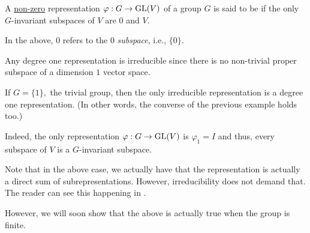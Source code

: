 \begin{defn}%
	A \underline{non-zero} representation $\varphi:G\to \operatorname{GL}(V)$ of a group $G$ is said to be  if the only $G$-invariant subspaces of $V$ are $0$ and $V.$
\end{defn}
In the above, $0$ refers to the $0$ \emph{subspace}, i.e., $\{0\}.$

\begin{ex}
	Any degree one representation is irreducible since there is no non-trivial proper subspace of a dimension $1$ vector space.
\end{ex}

\begin{ex}
	If $G = \{1\},$ the trivial group, then the only irreducible representation is a degree one representation. (In other words, the converse of the previous example holds too.)

	Indeed, the only representation $\varphi:G\to \operatorname{GL}(V)$ is $\varphi_1 = I$ and thus, every subspace of $V$ is a $G$-invariant subspace.
\end{ex}

\begin{rem}
	Note that in the above case, we actually have that the representation is actually a direct sum of subrepresentations. However, irreducibility does not demand that. The reader can see this happening in . %

	However, we will soon show that the above is actually true when the group is finite.
\end{rem}

